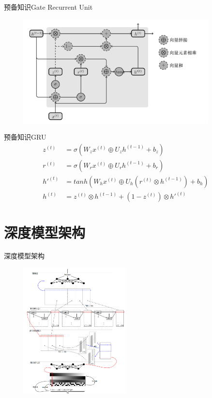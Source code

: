 \documentclass[table]{beamer}
\begin{document}
\begin{frame}{预备知识}{Gate Recurrent Unit}
\begin{figure}
	\centering
	\includegraphics[width=0.9\textwidth]{pic/pptgru}
\end{figure}
\end{frame}


\begin{frame}{预备知识}{GRU}
\begin{align}
z^{(t)} &= \sigma(W_z x^{(t)}\oplus  U_z h^{(t-1)}+b_z)\\
r^{(t)} &= \sigma(W_r x^{(t)}\oplus U_r h^{(t-1)}+b_r)\\
h'^{(t)}&= tanh(W_h x^{(t)}\oplus U_h(r^{(t)}\otimes h^{(t-1)})+b_h)\\
h^{(t)} &= z^{(t)}\otimes h^{(t-1)}+(1-z^{(t)})\otimes h'^{(t)}
\end{align}
\end{frame}

\section{深度模型架构}
\begin{frame}{深度模型架构}
\begin{figure}
	\centering
	\includegraphics[width=0.5\textwidth]{pic/pptcrnn}
\end{figure}
\end{frame}
\end{document}
